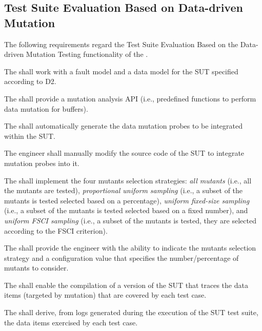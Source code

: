 
\subsection{Test Suite Evaluation Based on Data-driven Mutation}
\label{sec:dataDriven}

The following requirements regard the Test Suite Evaluation Based on the Data-driven Mutation Testing functionality of the \FAQAS.

\RQ{} The \FAQAS shall work with a fault model and a data model for the SUT specified according to D2.

\RQ{} The \FAQAS shall provide a mutation analysis API (i.e., predefined functions to perform data mutation for buffers).

\RQ{} The \FAQAS shall automatically generate the data mutation probes to be integrated within the SUT.

\RQ{} The engineer shall manually modify the source code of the SUT to integrate mutation probes into it.

%

\RQ{} The \FAQAS shall implement the four mutants selection strategies: \emph{all mutants} (i.e., all the mutants are tested), \emph{proportional uniform sampling} (i.e., a subset of the mutants is tested selected based on a percentage), \emph{uniform fixed-size sampling} (i.e., a subset of the mutants is tested selected based on a fixed number), and \emph{uniform FSCI sampling} (i.e., a subset of the mutants is tested, they are selected according to the FSCI criterion).

\RQ{} The \FAQAS shall provide the engineer with the ability to indicate the mutants selection strategy and a configuration value that specifies the number/percentage of mutants to consider.

\RQ{} The \FAQAS shall enable the compilation of a version of the SUT that traces the data items (targeted by mutation) that are covered by each test case.

\RQ{} The \FAQAS shall derive, from logs generated during the execution of the SUT test suite, the data items exercised by each test case.

